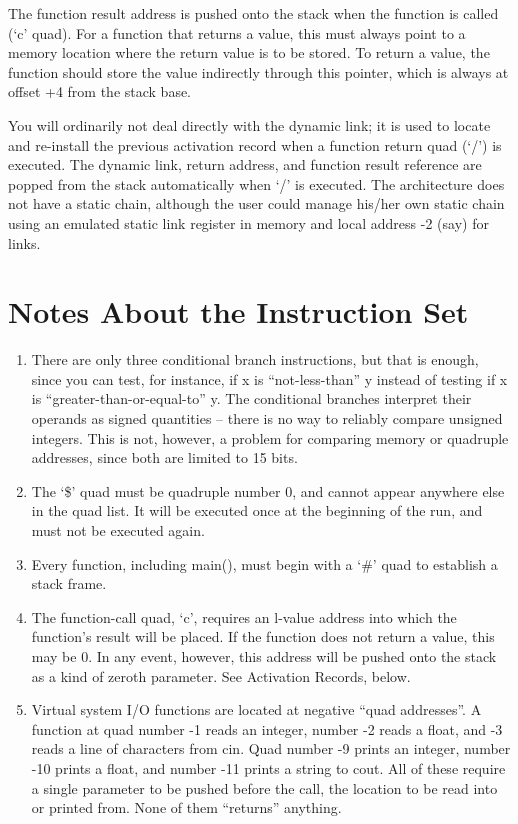 \documentclass[12pt]{article}
\begin{document}
     

The function result address is pushed onto the stack when the function is called (`c' quad). For a function that returns a value, this must always point to a memory location where the return value is to be stored. To return a value, the function should store the value indirectly through this pointer, which is always at offset +4 from the stack base.

You will ordinarily not deal directly with the dynamic link; it is used to locate and re-install the previous activation record when a function return quad (`/') is executed. The dynamic link, return address, and function result reference are popped from the stack automatically when `/' is executed.
The architecture does not have a static chain, although the user could manage his/her own static chain using an emulated static link register in memory and local address -2 (say) for links.

\section*{Notes About the Instruction Set}
\begin{enumerate}
     \item There are only three conditional branch instructions, but that is enough, since you can test,
          for instance, if x is ``not-less-than'' y instead of testing if x is ``greater-than-or-equal-to'' y.
          The conditional branches interpret their operands as signed quantities -- there is no way to reliably
          compare unsigned integers. This is not, however, a problem for comparing memory or quadruple
          addresses, since both are limited to 15 bits.
     \item The `\$' quad must be quadruple number 0, and cannot appear anywhere else in the quad list.
          It will be executed once at the beginning of the run, and must not be executed again.
     \item Every function, including main(), must begin with a `\#' quad to establish a stack frame.
     \item The function-call quad, `c', requires an l-value address into which the function's result will be placed.
          If the function does not return a value, this may be 0. In any event, however, this address will be pushed
          onto the stack as a kind of zeroth parameter. See Activation Records,  below.
     \item Virtual system I/O functions are located at negative ``quad addresses''.  A function at quad number -1 reads
          an integer, number -2 reads a float, and -3 reads a line of characters from cin.
          Quad number -9 prints an integer, number -10 prints a float, and number -11 prints a string to cout.
          All of these require a single parameter to be pushed before the call, the location to be read into or printed from.
          None of them ``returns'' anything.
\end{enumerate}
\end{document}
